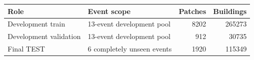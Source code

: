 \begin{tabular}{llrr}
\toprule
Role & Event scope & Patches & Buildings \\
\midrule
Development train & 13-event development pool & 8202 & 265273 \\
Development validation & 13-event development pool & 912 & 30735 \\
Final TEST & 6 completely unseen events & 1920 & 115349 \\
\bottomrule
\end{tabular}
